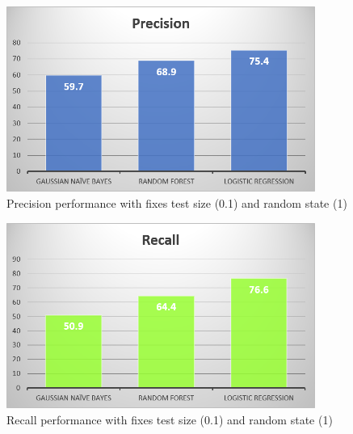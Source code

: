 \documentclass[]{IEEEtran}
\begin{document}
\begin{figure}[ht]
    \centering
    \begin{minipage}{0.5\textwidth}
        \centering
        \includegraphics[width=0.9\textwidth]{Precision.png}
        \caption{Precision performance with fixes test size (0.1) and random state (1) \label{precision}}
    \end{minipage}\hfill
    \end{figure}
\begin{figure}[ht]
    \begin{minipage}{0.5\textwidth}
        \centering
        \includegraphics[width=0.9\textwidth]{Recall.png}
        \caption{Recall performance with fixes test size (0.1) and random state (1) \label{recall}}
    \end{minipage}\hfill
    \end{figure}
\end{document}
